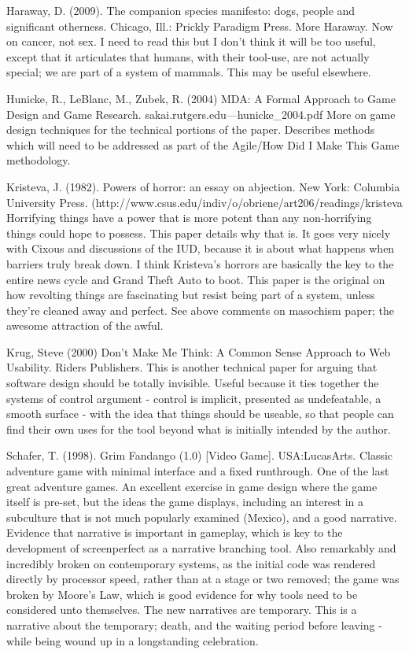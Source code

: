 Haraway, D. (2009). The companion species manifesto: dogs, people and significant otherness. Chicago, 		Ill.: Prickly Paradigm Press.
	More Haraway. Now on cancer, not sex. I need to read this but I don’t think it will be too useful, except that it articulates that humans, with their tool-use, are not actually special; we are part of a system of mammals. This may be useful elsewhere.

Hunicke, R., LeBlanc, M., Zubek, R. (2004) MDA: A Formal Approach to Game Design and Game Research. sakai.rutgers.edu—hunicke_2004.pdf
	More on game design techniques for the technical portions of the paper. Describes methods which will need to be addressed as part of the Agile/How Did I Make This Game methodology.

Kristeva, J. (1982). Powers of horror: an essay on abjection. New York: Columbia University Press. (http://www.csus.edu/indiv/o/obriene/art206/readings/kristeva%
	Horrifying things have a power that is more potent than any non-horrifying things could hope to possess. This paper details why that is. It goes very nicely with Cixous and discussions of the IUD, because it is about what happens when barriers truly break down. I think Kristeva’s horrors are basically the key to the entire news cycle and Grand Theft Auto to boot. This paper is the original on how revolting things are fascinating but resist being part of a system, unless they’re cleaned away and perfect. See above comments on masochism paper; the awesome attraction of the awful.


Krug, Steve (2000) Don’t Make Me Think: A Common Sense Approach to Web Usability.
	Riders Publishers.
	This is another technical paper for arguing that software design should be totally invisible. Useful because it ties together the systems of control argument - control is implicit, presented as undefeatable, a smooth surface - with the idea that things should be useable, so that people can find their own uses for the tool beyond what is initially intended by the author.

Schafer, T. (1998). Grim Fandango (1.0) [Video Game]. USA:LucasArts.
	Classic adventure game with minimal interface and a fixed runthrough. One of the last great adventure games. An excellent exercise in game design where the game itself is pre-set, but the ideas the game displays, including an interest in a subculture that is not much popularly examined (Mexico), and a good narrative. Evidence that narrative is important in gameplay, which is key to the development of screenperfect as a narrative branching tool. Also remarkably and incredibly broken on contemporary systems, as the initial code was rendered directly by processor speed, rather than at a stage or two removed; the game was broken by Moore’s Law, which is good evidence for why tools need to be considered unto themselves. The new narratives are temporary. This is a narrative about the temporary; death, and the waiting period before leaving - while being wound up in a longstanding celebration.

